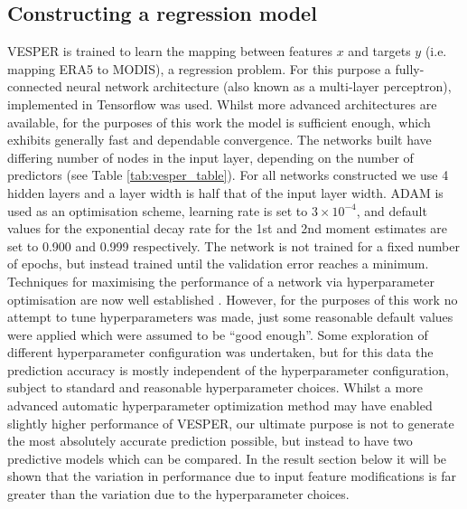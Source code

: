 \documentclass[hess, twostagejnl]{copernicus}
\begin{document}
\subsection{Constructing a regression model}
VESPER is trained to learn the mapping between features $x$ and targets $y$ (i.e. mapping ERA5 to MODIS), a regression problem. For this purpose a fully-connected neural network architecture (also known as a multi-layer perceptron), implemented in Tensorflow \citep{2016arXiv160304467A} was used. Whilst more advanced architectures are available, for the purposes of this work the model is sufficient enough, which exhibits generally fast and dependable convergence. The networks built have differing number of nodes in the input layer, depending on the number of predictors (see Table \ref{tab:vesper_table}). For all networks constructed we use 4 hidden layers and a layer width is half that of the input layer width. ADAM \citep{2014adam} is used as an optimisation scheme, learning rate is set to $3 \times 10^{-4}$, and default values for the exponential decay rate for the 1st and 2nd moment estimates are set to 0.900 and 0.999 respectively. The network is not trained for a fixed number of epochs, but instead trained until the validation error reaches a minimum. Techniques for maximising the performance of a network via hyperparameter optimisation are now well established \citep{HPO2,HPO1}. However, for the purposes of this work no attempt to tune hyperparameters was made, just some reasonable default values were applied which were assumed to be “good enough”. Some exploration of different hyperparameter configuration was undertaken, but for this data the prediction accuracy is mostly independent of the hyperparameter configuration, subject to standard and reasonable hyperparameter choices. Whilst a more advanced automatic hyperparameter optimization method may have enabled slightly higher performance of VESPER, our ultimate purpose is not to generate the most absolutely accurate prediction possible, but instead to have two predictive models which can be compared. In the result section below it will be shown that the variation in performance due to input feature modifications is far greater than the variation due to the hyperparameter choices. \newline 
\end{document}
